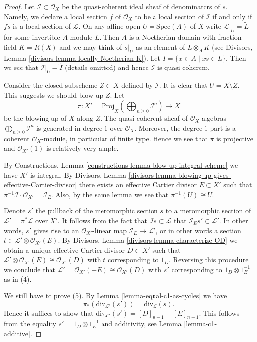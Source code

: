 \begin{proof}
Let $\mathcal{I} \subset \mathcal{O}_X$ be the quasi-coherent ideal sheaf
of denominators of $s$. Namely, we declare a local section
$f$ of $\mathcal{O}_X$ to be a local section of $\mathcal{I}$
if and only if $fs$ is a local section of $\mathcal{L}$.
On any affine open $U = \text{Spec}(A)$
of $X$ write $\mathcal{L}|_U = \widetilde{L}$ for some invertible
$A$-module $L$. Then $A$ is a Noetherian domain with fraction field
$K = R(X)$ and we may think of $s|_U$ as an element of
$L \otimes_A K$ (see
Divisors, Lemma \ref{divisors-lemma-locally-Noetherian-K}).
Let $I = \{x \in A \mid xs \in L\}$. Then we see that
$\mathcal{I}|_U = \widetilde{I}$ (details omitted) and hence
$\mathcal{I}$ is quasi-coherent.

\medskip\noindent
Consider the closed subscheme $Z \subset X$ defined by $\mathcal{I}$.
It is clear that $U = X \setminus Z$. This suggests we should blow
up $Z$. Let
$$
\pi : X' = 
\underline{\text{Proj}}_X
\left(\bigoplus\nolimits_{n \geq 0} \mathcal{I}^n\right)
\longrightarrow
X
$$
be the blowing up of $X$ along $Z$. The quasi-coherent
sheaf of $\mathcal{O}_X$-algebras
$\bigoplus\nolimits_{n \geq 0} \mathcal{I}^n$
is generated in degree $1$ over $\mathcal{O}_X$.
Moreover, the degree $1$ part is a coherent $\mathcal{O}_X$-module,
in particular of finite type. Hence we see that $\pi$
is projective and $\mathcal{O}_{X'}(1)$ is relatively very ample.

\medskip\noindent
By Constructions, Lemma \ref{constructions-lemma-blow-up-integral-scheme}
we have $X'$ is integral. By
Divisors, Lemma \ref{divisors-lemma-blowing-up-gives-effective-Cartier-divisor}
there exists an effective Cartier divisor $E \subset X'$ such that
$\pi^{-1}\mathcal{I} \cdot \mathcal{O}_{X'} = \mathcal{I}_E$.
Also, by the same lemma we see that $\pi^{-1}(U) \cong U$.

\medskip\noindent
Denote $s'$ the pullback of the meromorphic section $s$ to a meromorphic
section of $\mathcal{L}' = \pi^*\mathcal{L}$ over $X'$.
It follows from the fact that $\mathcal{I}s \subset \mathcal{L}$
that $\mathcal{I}_Es' \subset \mathcal{L}'$. In other words,
$s'$ gives rise to an $\mathcal{O}_{X'}$-linear map
$\mathcal{I}_E \to \mathcal{L}'$, or in other words
a section $t \in \mathcal{L}' \otimes \mathcal{O}_{X'}(E)$.
By Divisors, Lemma \ref{divisors-lemma-characterize-OD} we obtain a unique
effective Cartier divisor $D \subset X'$ such that
$\mathcal{L}' \otimes \mathcal{O}_{X'}(E) \cong \mathcal{O}_{X'}(D)$
with $t$ corresponding to $1_D$. Reversing this procedure
we conclude that
$\mathcal{L}' = \mathcal{O}_{X'}(-E) \cong \mathcal{O}_{X'}(D)$
with $s'$ corresponding to $1_D \otimes 1_E^{-1}$ as in (4).

\medskip\noindent
We still have to prove (5).
By Lemma \ref{lemma-equal-c1-as-cycles} we have
$$
\pi_*(\text{div}_{\mathcal{L}'}(s')) = \text{div}_{\mathcal{L}}(s).
$$
Hence it suffices to show that
$\text{div}_{\mathcal{L}'}(s') = [D]_{n - 1} - [E]_{n - 1}$.
This follows from the equality
$s' = 1_D \otimes 1_E^{-1}$ and additivity, see
Lemma \ref{lemma-c1-additive}.
\end{proof}

